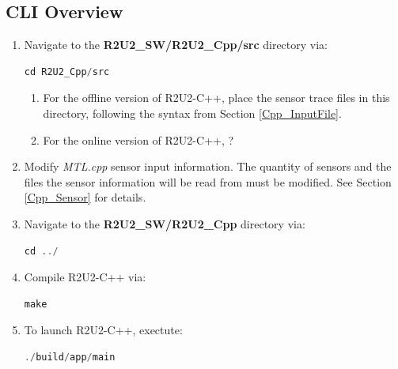 \subsection{CLI Overview}
\begin{enumerate}
	\item Navigate to the \textbf{R2U2\_SW/R2U2\_Cpp/src} directory via:
	\begin{lstlisting}[language=C]
	cd R2U2_Cpp/src
	\end{lstlisting}
	\begin{enumerate}
		\item For the offline version of R2U2-C++, place the sensor trace files in this directory, following the syntax from Section \ref{Cpp_InputFile}.
		\item For the online version of R2U2-C++, ?
	\end{enumerate}
	\item Modify \textit{MTL.cpp} sensor input information. The quantity of sensors and the files the sensor information will be read from must be modified. See Section \ref{Cpp_Sensor} for details.
	\item Navigate to the \textbf{R2U2\_SW/R2U2\_Cpp} directory via:
	\begin{lstlisting}[language=C]
	cd ../
	\end{lstlisting}
	\item Compile R2U2-C++ via:
	\begin{lstlisting}[language=C]
	make
	\end{lstlisting}
	\item To launch R2U2-C++, exectute:
	\begin{lstlisting}[language=C]
	./build/app/main
	\end{lstlisting}
\end{enumerate}

\clearpage
